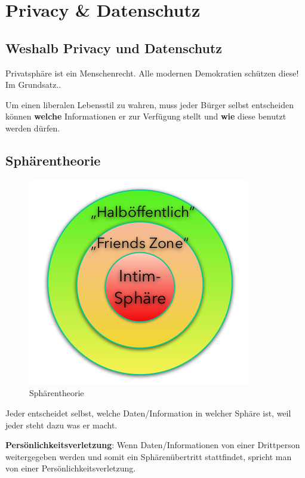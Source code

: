 \hypertarget{privacy-datenschutz}{%
\section{Privacy \& Datenschutz}\label{privacy-datenschutz}}

\hypertarget{weshalb-privacy-und-datenschutz}{%
\subsection{Weshalb Privacy und
Datenschutz}\label{weshalb-privacy-und-datenschutz}}

Privatsphäre ist ein Menschenrecht. Alle modernen Demokratien schützen
diese! Im Grundsatz..

Um einen liberalen Lebensstil zu wahren, muss jeder Bürger selbst
entscheiden können \textbf{welche} Informationen er zur Verfügung stellt
und \textbf{wie} diese benutzt werden dürfen.

\hypertarget{sphuxe4rentheorie}{%
\subsection{Sphärentheorie}\label{sphuxe4rentheorie}}

\begin{figure}
\centering
\includegraphics{figures/sphaerentheorie.png}
\caption{Sphärentheorie}
\end{figure}

Jeder entscheidet selbst, welche Daten/Information in welcher Sphäre
ist, weil jeder steht dazu was er macht.

\textbf{Persönlichkeitsverletzung}: Wenn Daten/Informationen von einer
Drittperson weitergegeben werden und somit ein Sphärenübertritt
stattfindet, spricht man von einer Persönlichkeitsverletzung.

